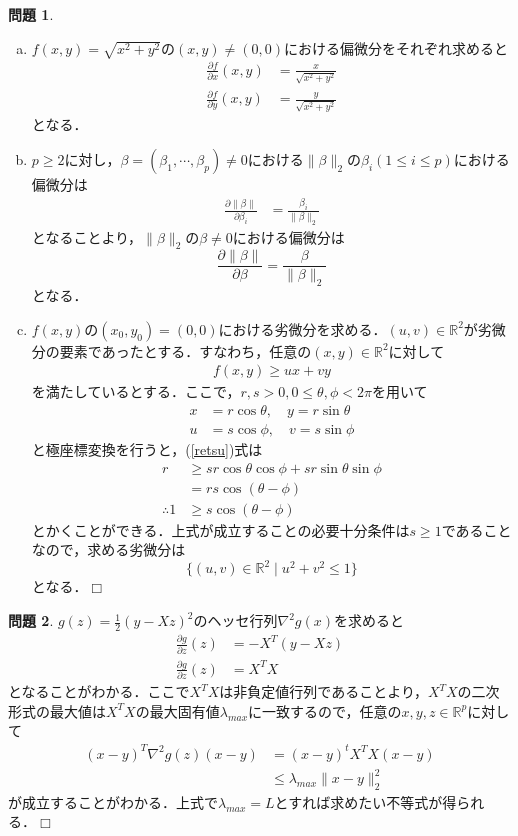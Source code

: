\documentclass{jsarticle}
\theoremstyle{definition}
\newtheorem{Ex}{問題}
\theoremstyle{mystyle} %
\def\qed{\hfill$\Box$}
\begin{document}
\large
\begin{Ex}
\begin{enumerate}[(a)]
  \item $f(x,y)=\sqrt{x^2+y^2}$の$(x,y)\neq (0,0)$における偏微分をそれぞれ求めると
  \begin{align*}
    \frac{\partial f}{\partial x}(x,y)&=\frac{x}{\sqrt{x^2+y^2}}\\
    \frac{\partial f}{\partial y}(x,y)&=\frac{y}{\sqrt{x^2+y^2}}
  \end{align*}
となる．\\

\item $p\geq 2$に対し，$\beta=(\beta_1,\cdots,\beta_p)\neq 0$における$\|\beta\|_2$の$\beta_i(1\leq i\leq p)$における偏微分は
\begin{align*}
  \frac{\partial \|\beta\|}{\partial \beta_i}&=\frac{\beta_i}{\|\beta\|_2}
\end{align*}
となることより，$\|\beta\|_2$の$\beta\neq 0$における偏微分は
$$\frac{\partial \|\beta\|}{\partial \beta}=\frac{\beta}{\|\beta\|_2}$$
となる．\\

\item $f(x,y)$の$(x_0,y_0)=(0,0)$における劣微分を求める．$(u,v)\in\mathbb{R}^2$が劣微分の要素であったとする．すなわち，任意の$(x,y)\in \mathbb{R}^2$に対して
\begin{align}
  \label{retsu}
  f(x,y)\geq ux+vy
\end{align}
を満たしているとする．ここで，$r,s>0,0\leq \theta,\phi< 2\pi$を用いて
\begin{align*}
  x&=r\cos\theta,\quad y =r\sin\theta\\
  u&=s\cos\phi,\quad v = s\sin\phi
\end{align*}
と極座標変換を行うと，(\ref{retsu})式は
\begin{align*}
  r&\geq sr\cos\theta\cos\phi+sr\sin\theta\sin\phi\\
&=rs\cos(\theta-\phi)\\
\therefore 1&\geq s\cos(\theta-\phi)
\end{align*}
とかくことができる．上式が成立することの必要十分条件は$s\geq 1$であることなので，求める劣微分は
$$\{(u,v)\in\mathbb{R}^2\mid u^2+v^2\leq 1\}$$
となる．\qed
\end{enumerate}
\end{Ex}
\begin{Ex}
$g(z)=\frac{1}{2}(y-Xz)^2$のヘッセ行列$\nabla^2 g(x)$を求めると
\begin{align*}
  \frac{\partial g}{\partial z}(z)&=-X^T(y-Xz)\\
  \frac{\partial g}{\partial z}(z)&=X^TX
\end{align*}
となることがわかる．ここで$X^TX$は非負定値行列であることより，$X^TX$の二次形式の最大値は$X^TX$の最大固有値$\lambda_{max}$に一致するので，任意の$x,y,z\in \mathbb{R}^p$に対して
\begin{align*}
  (x-y)^T \nabla^2g(z)(x-y)&=(x-y)^tX^TX(x-y)\\
  &\leq \lambda_{max}\|x-y\|_2^2
\end{align*}
が成立することがわかる．上式で$\lambda_{max}=L$とすれば求めたい不等式が得られる．\qed\\
\end{Ex}
\end{document}
